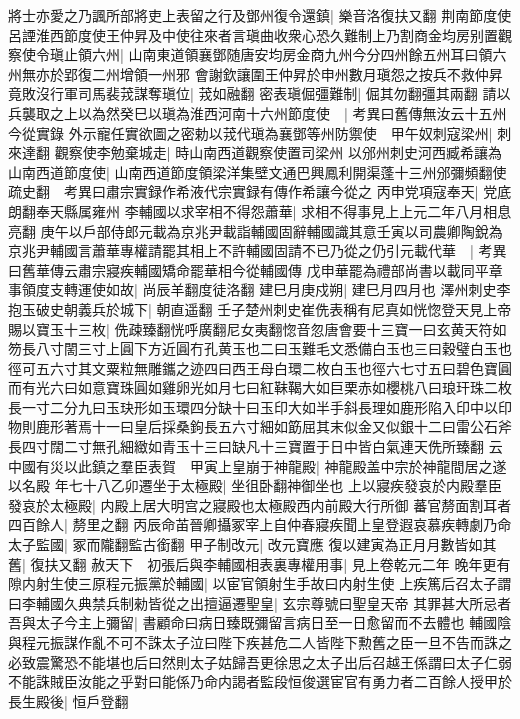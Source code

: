 將士亦愛之乃諷所部將吏上表留之行及鄧州復令還鎮|{
	樂音洛復扶又翻}
荆南節度使呂諲淮西節度使王仲昇及中使往來者言瑱曲收衆心恐久難制上乃割商金均房别置觀察使令瑱止領六州|{
	山南東道領襄鄧随唐安均房金商九州今分四州餘五州耳曰領六州無亦於郢復二州增領一州邪}
會謝欽讓圍王仲昇於申州數月瑱怨之按兵不救仲昇竟敗沒行軍司馬裴茙謀奪瑱位|{
	茙如融翻}
密表瑱倔彊難制|{
	倔其勿翻彊其兩翻}
請以兵襲取之上以為然癸巳以瑱為淮西河南十六州節度使　|{
	考異曰舊傳無汝云十五州今從實錄}
外示寵任實欲圖之密勅以茙代瑱為襄鄧等州防禦使　甲午奴刺寇梁州|{
	刺來達翻}
觀察使李勉棄城走|{
	時山南西道觀察使置司梁州}
以邠州刺史河西臧希讓為山南西道節度使|{
	山南西道節度領梁洋集壁文通巴興鳳利開渠蓬十三州邠彌頻翻使疏史翻　考異曰肅宗實録作希液代宗實録有傳作希讓今從之}
丙申党項寇奉天|{
	党底朗翻奉天縣属雍州}
李輔國以求宰相不得怨蕭華|{
	求相不得事見上上元二年八月相息亮翻}
庚午以戶部侍郎元載為京兆尹載詣輔國固辭輔國識其意壬寅以司農卿陶銳為京兆尹輔國言蕭華專權請罷其相上不許輔國固請不已乃從之仍引元載代華　|{
	考異曰舊華傳云肅宗寢疾輔國矯命罷華相今從輔國傳}
戊申華罷為禮部尚書以載同平章事領度支轉運使如故|{
	尚辰羊翻度徒洛翻}
建巳月庚戍朔|{
	建巳月四月也}
澤州刺史李抱玉破史朝義兵於城下|{
	朝直遥翻}
壬子楚州刺史崔侁表稱有尼真如恍惚登天見上帝賜以寶玉十三枚|{
	侁疎臻翻恍呼廣翻尼女夷翻惚音忽唐會要十三寶一曰玄黄天符如笏長八寸䦚三寸上圓下方近圓冇孔黄玉也二曰玉難毛文悉備白玉也三曰穀璧白玉也徑可五六寸其文粟粒無雕鑴之迹四曰西王母白環二枚白玉也徑六七寸五曰碧色寶圓而有光六曰如意寶珠圓如雞卵光如月七曰紅靺鞨大如巨栗赤如櫻桃八曰琅玕珠二枚長一寸二分九曰玉玦形如玉環四分缺十曰玉印大如半手斜長理如鹿形陷入印中以印物則鹿形著焉十一曰皇后採桑鉤長五六寸細如筯屈其末似金又似銀十二曰雷公石斧長四寸闊二寸無孔細緻如青玉十三曰缺凡十三寶置于日中皆白氣連天侁所臻翻}
云中國有災以此鎮之羣臣表賀　甲寅上皇崩于神龍殿|{
	神龍殿盖中宗於神龍間居之遂以名殿}
年七十八乙卯遷坐于太極殿|{
	坐徂卧翻神御坐也}
上以寢疾發哀於内殿羣臣發哀於太極殿|{
	内殿上居大明宫之寢殿也太極殿西内前殿大行所御}
蕃官剺面割耳者四百餘人|{
	剺里之翻}
丙辰命苖晉卿攝冢宰上自仲春寢疾聞上皇登遐哀慕疾轉劇乃命太子監國|{
	冢而隴翻監古銜翻}
甲子制改元|{
	改元寶應}
復以建寅為正月月數皆如其舊|{
	復扶又翻}
赦天下　初張后與李輔國相表裏專權用事|{
	見上卷乾元二年}
晚年更有隙内射生使三原程元振黨於輔國|{
	以宦官領射生手故曰内射生使}
上疾篤后召太子謂曰李輔國久典禁兵制勑皆從之出擅逼遷聖皇|{
	玄宗尊號曰聖皇天帝}
其罪甚大所忌者吾與太子今主上彌留|{
	書顧命曰病日臻既彌留言病日至一日愈留而不去體也}
輔國陰與程元振謀作亂不可不誅太子泣曰陛下疾甚危二人皆陛下勲舊之臣一旦不告而誅之必致震驚恐不能堪也后曰然則太子姑歸吾更徐思之太子出后召越王係謂曰太子仁弱不能誅賊臣汝能之乎對曰能係乃命内謁者監段恒俊選宦官有勇力者二百餘人授甲於長生殿後|{
	恒戶登翻}
